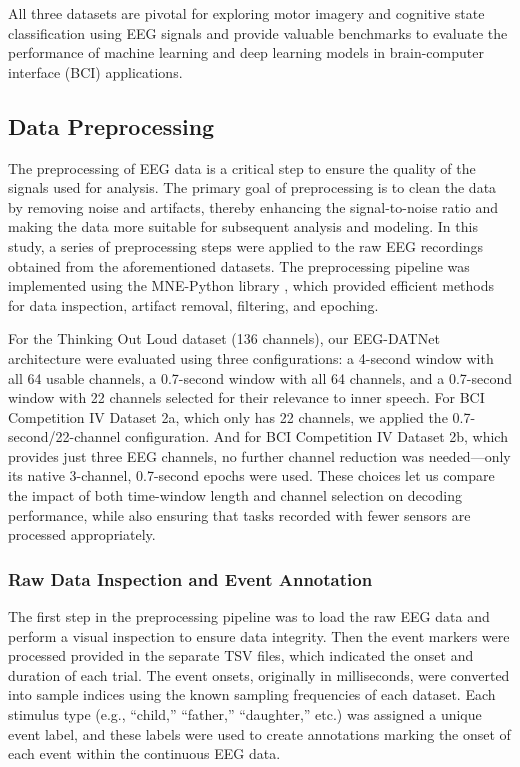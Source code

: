 \documentclass[pdflatex,sn-mathphys-num]{sn-jnl}%
\theoremstyle{thmstyleone}%
\theoremstyle{thmstyletwo}%
\theoremstyle{thmstylethree}%
\begin{document}
All three datasets are pivotal for exploring motor imagery and cognitive state classification using EEG signals and provide valuable benchmarks to evaluate the performance of machine learning and deep learning models in brain-computer interface (BCI) applications.



\subsection{Data Preprocessing}\label{subsec2}

The preprocessing of EEG data is a critical step to ensure the quality of the signals used for analysis. The primary goal of preprocessing is to clean the data by removing noise and artifacts, thereby enhancing the signal-to-noise ratio and making the data more suitable for subsequent analysis and modeling. In this study, a series of preprocessing steps were applied to the raw EEG recordings obtained from the aforementioned datasets. The preprocessing pipeline was implemented using the MNE-Python library \cite{Gramfort2013}, which provided efficient methods for data inspection, artifact removal, filtering, and epoching.

For the Thinking Out Loud dataset (136 channels), our EEG-DATNet architecture were evaluated using three configurations: a 4-second window with all 64 usable channels, a 0.7-second window with all 64 channels, and a 0.7-second window with 22 channels selected for their relevance to inner speech. For BCI Competition IV Dataset 2a, which only has 22 channels, we applied the 0.7-second/22-channel configuration. And for BCI Competition IV Dataset 2b, which provides just three EEG channels, no further channel reduction was needed—only its native 3-channel, 0.7-second epochs were used. These choices let us compare the impact of both time-window length and channel selection on decoding performance, while also ensuring that tasks recorded with fewer sensors are processed appropriately.

\subsubsection{Raw Data Inspection and Event Annotation}\label{subsec3}

The first step in the preprocessing pipeline was to load the raw EEG data and perform a visual inspection to ensure data integrity. Then the event markers were processed provided in the separate TSV files, which indicated the onset and duration of each trial. The event onsets, originally in milliseconds, were converted into sample indices using the known sampling frequencies of each dataset. Each stimulus type (e.g., ``child,'' ``father,'' ``daughter,'' etc.) was assigned a unique event label, and these labels were used to create annotations marking the onset of each event within the continuous EEG data.
\end{document}
